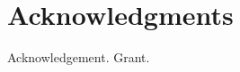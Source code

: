 \documentclass{acm_proc_article-sp}
\begin{document}
\section{Acknowledgments}
Acknowledgement. Grant.

%

%
%

\balancecolumns
\end{document}
